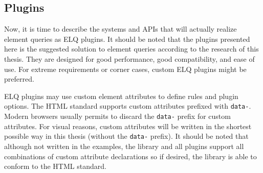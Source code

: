 \documentclass[a4paper,11pt]{kth-mag}
\newcommand{\code}[1]{\texttt{#1}}
\begin{document}



      \subsection{Plugins}
        Now, it is time to describe the systems and \glspl{API} that will actually realize element queries as \gls{ELQ} plugins.
        It should be noted that the plugins presented here is the suggested solution to element queries according to the research of this thesis.
        They are designed for good performance, good compatibility, and ease of use.
        For extreme requirements or corner cases, custom \gls{ELQ} plugins might be preferred.

        \Gls{ELQ} plugins may use custom element attributes to define rules and plugin options.
        The \gls{HTML} standard supports custom attributes prefixed with \code{data-}.
        Modern browsers usually permits to discard the \code{data-} prefix for custom attributes.
        For visual reasons, custom attributes will be written in the shortest possible way in this thesis (without the \code{data-} prefix).
        It should be noted that although not written in the examples, the library and all plugins support all combinations of custom attribute declarations so if desired, the library is able to conform to the \gls{HTML} standard.
\end{document}
